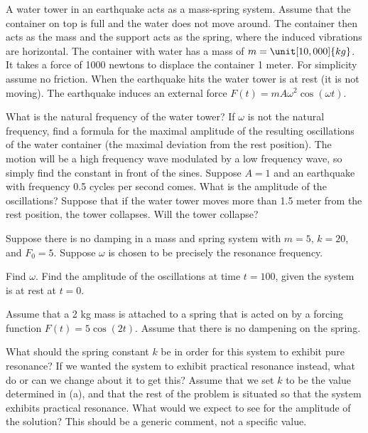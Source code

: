 \begin{exercise}
\pagebreak[3]
A water tower in an earthquake acts as a mass-spring system.
Assume that the container on top is full and the water does not move around.
The container then acts as the mass and the support acts as the spring, where
the induced vibrations are horizontal.  The container with water
has a mass of $m=\unit[10,000]{kg}$.  It takes a force of 1000 newtons
to displace the container 1 meter.  For simplicity assume no friction.
When the earthquake hits the water tower is at rest (it is not moving).
%
The earthquake induces an external force 
$F(t) = m A \omega^2 \cos (\omega t)$.
\begin{tasks}
\task
What is the natural frequency of the water tower?
\task
If $\omega$ is not the natural frequency, find a formula for the maximal
amplitude of the resulting oscillations of the water container (the maximal
deviation from the rest position).  The motion will be a high frequency wave
modulated by a low frequency wave, so simply find the constant in front of the
sines.
\task
Suppose $A = 1$ and an earthquake with frequency 0.5 cycles per second
comes.  What is the amplitude of the oscillations?  Suppose that if the water
tower moves more than 1.5 meter from the rest position, the tower collapses.
Will the tower collapse?
\end{tasks}
\end{exercise}

\begin{exercise}\ansMark%
Suppose there is no damping in a mass and spring system with
$m = 5$, $k= 20$, and $F_0 = 5$.  Suppose $\omega$ is chosen
to be precisely the resonance frequency.
\begin{tasks}
\task
Find $\omega$.
\task
Find the amplitude of the oscillations at time $t=100$, given the system is at
rest at $t=0$.
\end{tasks}
\end{exercise}

\begin{exercise}
Assume that a 2 kg mass is attached to a spring that is acted on by a forcing function $F(t) = 5 \cos(2t)$. Assume that there is no dampening on the spring.
\begin{tasks}
\task What should the spring constant $k$ be in order for this system to exhibit pure resonance?
\task If we wanted the system to exhibit practical resonance instead, what do or can we change about it to get this?
\task Assume that we set $k$ to be the value determined in (a), and that the rest of the problem is situated so that the system exhibits practical resonance. What would we expect to see for the amplitude of the solution? This should be a generic comment, not a specific value.
\end{tasks}
\end{exercise}

